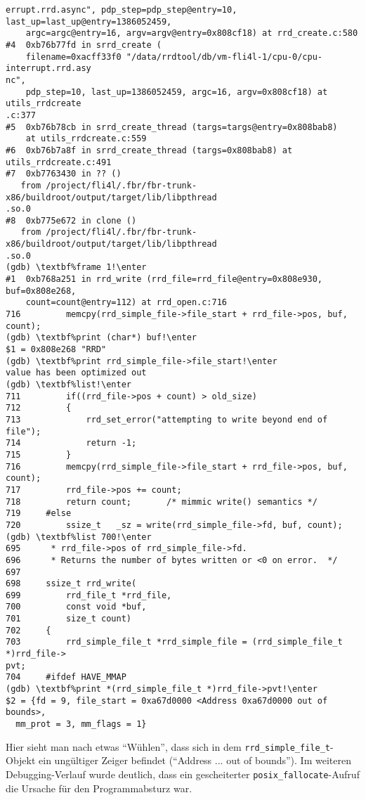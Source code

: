 \begin{example}
\begin{Verbatim}[commandchars=\\\%!]
errupt.rrd.async", pdp_step=pdp_step@entry=10, last_up=last_up@entry=1386052459,
    argc=argc@entry=16, argv=argv@entry=0x808cf18) at rrd_create.c:580
#4  0xb76b77fd in srrd_create (
    filename=0xacff33f0 "/data/rrdtool/db/vm-fli4l-1/cpu-0/cpu-interrupt.rrd.asy
nc",
    pdp_step=10, last_up=1386052459, argc=16, argv=0x808cf18) at utils_rrdcreate
.c:377
#5  0xb76b78cb in srrd_create_thread (targs=targs@entry=0x808bab8)
    at utils_rrdcreate.c:559
#6  0xb76b7a8f in srrd_create_thread (targs=0x808bab8) at utils_rrdcreate.c:491
#7  0xb7763430 in ?? ()
   from /project/fli4l/.fbr/fbr-trunk-x86/buildroot/output/target/lib/libpthread
.so.0
#8  0xb775e672 in clone ()
   from /project/fli4l/.fbr/fbr-trunk-x86/buildroot/output/target/lib/libpthread
.so.0
(gdb) \textbf%frame 1!\enter
#1  0xb768a251 in rrd_write (rrd_file=rrd_file@entry=0x808e930, buf=0x808e268,
    count=count@entry=112) at rrd_open.c:716
716         memcpy(rrd_simple_file->file_start + rrd_file->pos, buf, count);
(gdb) \textbf%print (char*) buf!\enter
$1 = 0x808e268 "RRD"
(gdb) \textbf%print rrd_simple_file->file_start!\enter
value has been optimized out
(gdb) \textbf%list!\enter
711         if((rrd_file->pos + count) > old_size)
712         {
713             rrd_set_error("attempting to write beyond end of file");
714             return -1;
715         }
716         memcpy(rrd_simple_file->file_start + rrd_file->pos, buf, count);
717         rrd_file->pos += count;
718         return count;       /* mimmic write() semantics */
719     #else
720         ssize_t   _sz = write(rrd_simple_file->fd, buf, count);
(gdb) \textbf%list 700!\enter
695      * rrd_file->pos of rrd_simple_file->fd.
696      * Returns the number of bytes written or <0 on error.  */
697
698     ssize_t rrd_write(
699         rrd_file_t *rrd_file,
700         const void *buf,
701         size_t count)
702     {
703         rrd_simple_file_t *rrd_simple_file = (rrd_simple_file_t *)rrd_file->
pvt;
704     #ifdef HAVE_MMAP
(gdb) \textbf%print *(rrd_simple_file_t *)rrd_file->pvt!\enter
$2 = {fd = 9, file_start = 0xa67d0000 <Address 0xa67d0000 out of bounds>,
  mm_prot = 3, mm_flags = 1}
\end{Verbatim}
\end{example}

Hier sieht man nach etwas ``Wühlen'', dass sich in dem
\texttt{rrd\_simple\_file\_t}-Objekt ein ungültiger Zeiger befindet
(``Address ... out of bounds''). Im weiteren Debugging-Verlauf wurde deutlich,
dass ein gescheiterter \texttt{posix\_fallocate}-Aufruf die Ursache für den
Programmabsturz war.

